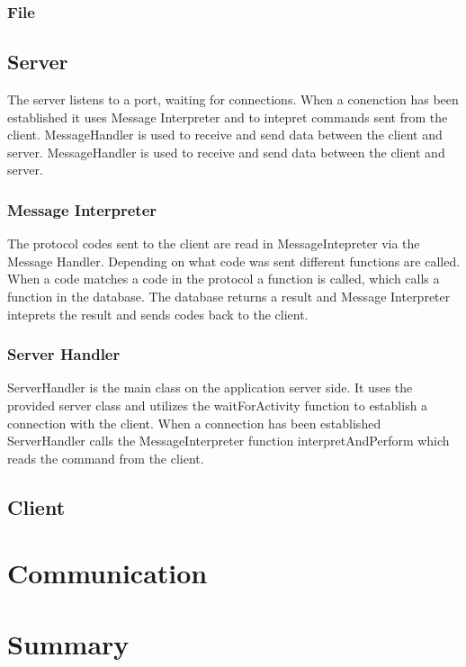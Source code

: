 \documentclass[a4paper, titlepage]{article}
\begin{document}
\subsubsection{File}

\subsection{Server}
 The server listens to a port, waiting for connections. When a conenction has been established it uses Message Interpreter and to intepret commands sent from the client. MessageHandler is used to receive and send data between the client and server. MessageHandler is used to receive and send data between the client and server.   
\subsubsection{Message Interpreter}
The protocol codes sent to the client are read in MessageIntepreter via the Message Handler. Depending on what code was sent different functions are called. When a code matches a code in the protocol a function is called, which calls a function in the database. The database returns a result and Message Interpreter inteprets the result and sends codes back to the client. 
\subsubsection{Server Handler}
ServerHandler is the main class on the application server side. It uses the provided server class and utilizes the waitForActivity function to establish a connection with the client. When a connection has been established ServerHandler calls the MessageInterpreter function interpretAndPerform which reads the command from the client.
\subsection{Client}

\section{Communication}\label{communication}

\section{Summary}\label{summary}

\newpage
\appendix
\end{document}
